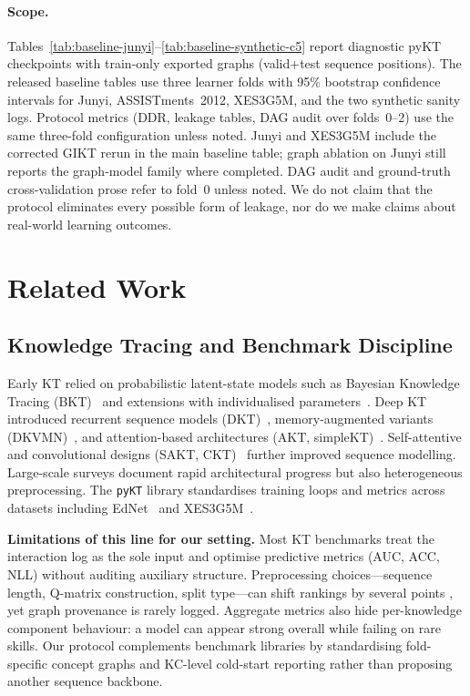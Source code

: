\documentclass[pdflatex,sn-basic]{sn-jnl}
\newcommand{\KC}{knowledge component}
\newcommand{\DDR}{\textsc{DDR}}
\begin{document}
\paragraph{Scope.}
Tables~\ref{tab:baseline-junyi}--\ref{tab:baseline-synthetic-c5} report diagnostic
pyKT checkpoints with train-only exported graphs (valid+test sequence positions).
The released baseline tables use three learner folds with 95\% bootstrap confidence
intervals for Junyi, ASSISTments~2012, XES3G5M, and the two synthetic sanity logs.
Protocol metrics (\DDR{}, leakage tables, DAG audit over folds~0--2) use the same
three-fold configuration unless noted. Junyi and XES3G5M include the corrected GIKT
rerun in the main baseline table; graph ablation on Junyi still reports the
graph-model family where completed.
DAG audit and ground-truth cross-validation prose refer to fold~0 unless noted.
We do not claim that the protocol eliminates
every possible form of leakage, nor do we make claims about real-world
learning outcomes.
\section{Related Work}
\label{sec:related}

\subsection{Knowledge Tracing and Benchmark Discipline}
\label{sec:related-kt}
Early KT relied on probabilistic latent-state models such as Bayesian
Knowledge Tracing (BKT)~\cite{corbett1995bkt} and extensions with
individualised parameters~\cite{yudelson2013pfa,khajah2016das3h}.
Deep KT introduced recurrent sequence models (DKT)~\cite{piech2015dkt},
memory-augmented variants (DKVMN)~\cite{zhang2017dkvmn}, and
attention-based architectures (AKT, simpleKT)~\cite{ghosh2020akt,liu2023simplekt,chen2022dimkt}. Self-attentive and
convolutional designs (SAKT, CKT)~\cite{pandey2019rkt,shen2021saint}
further improved sequence modelling. Large-scale surveys
\cite{abdelrahman2023kt_survey} document rapid architectural progress
but also heterogeneous preprocessing. The \texttt{pyKT} library
\cite{liu2022pykt} standardises training loops and metrics across
datasets including EdNet~\cite{choi2020ednet} and
XES3G5M~\cite{xes3g5m2023}.

\textbf{Limitations of this line for our setting.}
Most KT benchmarks treat the interaction log as the sole input and
optimise predictive metrics (AUC, ACC, NLL) without auditing auxiliary
structure. Preprocessing choices---sequence length, Q-matrix
construction, split type---can shift rankings by several points
\cite{liu2022pykt,abdelrahman2023kt_survey}, yet graph provenance is
rarely logged. Aggregate metrics also hide per-\KC{} behaviour: a model
can appear strong overall while failing on rare skills. Our protocol
complements benchmark libraries by standardising fold-specific concept
graphs and KC-level cold-start reporting rather than proposing another
sequence backbone.
\end{document}
